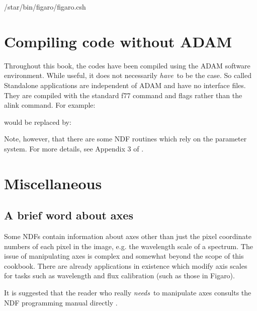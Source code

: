 \documentclass[11pt,nolof]{starlink}
\begin{document}
\begin{terminalv}
/star/bin/figaro/figaro.csh
\end{terminalv}

\section{Compiling code without ADAM}

Throughout this book, the codes have been compiled using the ADAM software
environment. While useful, it does not necessarily \emph{have}\, to be the
case. So called Standalone applications are independent of ADAM and have
no interface files. They are compiled with the standard \textsf{f77} command
and flags rather than the \textsf{alink} command. For example:

\begin{terminalv}
\end{terminalv}

would be replaced by:

\begin{terminalv}
\end{terminalv}

Note, however, that there are some NDF routines which rely on the parameter
system. For more details, see Appendix 3 of .

\section{Miscellaneous}

\subsection{A brief word about axes}

Some NDFs contain information about axes other than just the pixel
coordinate numbers of each pixel in the image, e.g. the wavelength scale
of a spectrum. The issue of manipulating axes is complex and somewhat
beyond the scope of this cookbook. There are already applications in
existence which modify axis scales for tasks such as wavelength and flux
calibration (such as those in Figaro).

It is suggested that the reader who really \emph{needs}\, to manipulate axes
consults the NDF programming manual directly .
\end{document}
